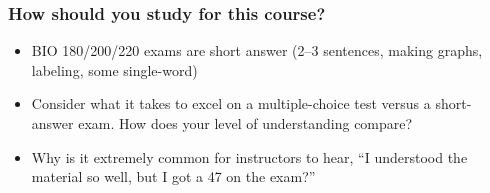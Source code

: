 
\begin{noheadline}
\begin{frame}
    \frametitle{How should you study for this course?}
    \begin{itemize}%
        \item BIO 180/200/220 exams are short answer (2--3 sentences, making
            graphs, labeling, some single-word)
        \item Consider what it takes to excel on a multiple-choice test versus
            a short-answer exam. How does your level of understanding compare?
        \item Why is it extremely common for instructors to hear, ``I
            understood the material so well, but I got a 47 on the exam?''
    \end{itemize}

\end{frame}
\end{noheadline}

